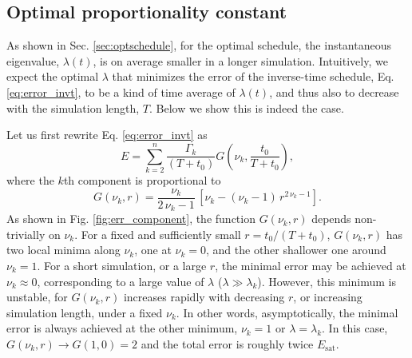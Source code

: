 \documentclass[reprint, floatfix]{revtex4-1}
\newcommand{\Err}{E}
\begin{document}
%







\subsection{\label{sec:optlambda}
Optimal proportionality constant
}




As shown in Sec. \ref{sec:optschedule},
for the optimal schedule,
the instantaneous eigenvalue, $\lambda(t)$,
is on average smaller
in a longer simulation.
%
Intuitively,
we expect the optimal $\lambda$
that minimizes the error of the inverse-time schedule,
Eq. \eqref{eq:error_invt},
to be a kind of time average of $\lambda(t)$,
and thus also to decrease with
the simulation length, $T$.
%
Below we show this is indeed the case.

Let us first rewrite Eq. \eqref{eq:error_invt} as
%
$$
\Err
=
\sum_{ k = 2 }^n
  \frac{ \Gamma_k  }
       { (T + t_0) }
  G\left( \nu_k, \frac{ t_0 } { T + t_0} \right),
$$
%
where the $k$th component is proportional to
%
$$
G\left( \nu_k, r \right)
=
\frac { \nu_k }
      { 2 \, \nu_k - 1 }
\,
\left[
  \nu_k
  -
  (\nu_k - 1) \,
  r^{2 \, \nu_k - 1}
\right].
$$
%
As shown in Fig. \ref{fig:err_component},
the function $G(\nu_k, r)$ depends non-trivially on $\nu_k$.
%
For a fixed and sufficiently small $r = t_0 / (T + t_0)$,
$G(\nu_k, r)$ has two local minima along $\nu_k$,
one at $\nu_k = 0$,
and the other shallower one around $\nu_k = 1$.
%
For a short simulation, or a large $r$,
the minimal error may be achieved at $\nu_k \approx 0$,
corresponding to a large value of $\lambda$
($\lambda \gg \lambda_k$).
%
However, this minimum is unstable,
for $G(\nu_k, r)$ increases rapidly
with decreasing $r$, or increasing simulation length,
under a fixed $\nu_k$.
%
In other words,
asymptotically, the minimal error
is always achieved at the other minimum,
$\nu_k = 1$ or $\lambda = \lambda_k$.
%
In this case,
$G(\nu_k, r) \to G(1, 0) = 2$
and the total error is roughly twice $E_\mathrm{sat}$.
\end{document}
